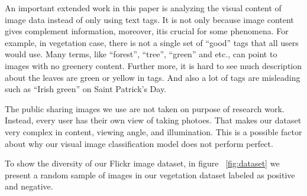 
An important extended work in this paper is analyzing the visual content of image data instead of
only using text tags. It is not only because image content gives complement information, moreover,
 itis crucial for some phenomena. For example, in vegetation case, 
there is not a single set of ``good''
tags that all users would use. Many terms, like ``forest'', ``tree'', ``green'' and etc., can point to images with no greenery content.
Further more, it is hard to see much description about the leaves are green or yellow in tags.
And also a lot of tags are misleading such as ``Irish green'' on Saint Patrick's Day. 




The public sharing images we use are not taken on purpose of research work. Instead, every user has their own view of taking photoes. That makes our dataset very complex in content, viewing angle, and illumination. 
This is a possible factor about 
why our visual image classification model does not perform perfect. 

To show the diversity of our Flickr image dataset, in figure ~\ref{fig:dataset} we present a random sample of images in our vegetation dataset labeled as positive and negative.


